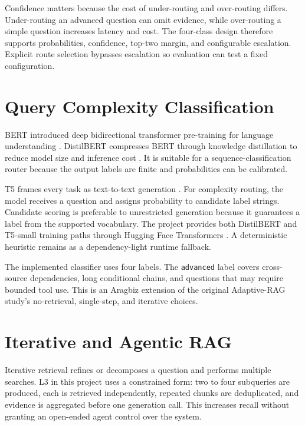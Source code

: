 Confidence matters because the cost of under-routing and over-routing differs.
Under-routing an advanced question can omit evidence, while over-routing a
simple question increases latency and cost. The four-class design therefore
supports probabilities, confidence, top-two margin, and configurable
escalation. Explicit route selection bypasses escalation so evaluation can test
a fixed configuration.

\section{Query Complexity Classification}

BERT introduced deep bidirectional transformer pre-training for language
understanding \cite{devlin2019bert}. DistilBERT compresses BERT through
knowledge distillation to reduce model size and inference cost
\cite{sanh2019distilbert,hinton2015distilling}. It is suitable for a
sequence-classification router because the output labels are finite and
probabilities can be calibrated.

T5 frames every task as text-to-text generation \cite{raffel2020t5}. For
complexity routing, the model receives a question and assigns probability to
candidate label strings. Candidate scoring is preferable to unrestricted
generation because it guarantees a label from the supported vocabulary. The
project provides both DistilBERT and T5-small training paths through Hugging
Face Transformers \cite{wolf2020transformers}. A deterministic heuristic
remains as a dependency-light runtime fallback.

The implemented classifier uses four labels. The \texttt{advanced} label covers
cross-source dependencies, long conditional chains, and questions that may
require bounded tool use. This is an Aragbiz extension of the original
Adaptive-RAG study's no-retrieval, single-step, and iterative choices.

\section{Iterative and Agentic RAG}

Iterative retrieval refines or decomposes a question and performs multiple
searches. L3 in this project uses a constrained form: two to four subqueries are
produced, each is retrieved independently, repeated chunks are deduplicated,
and evidence is aggregated before one generation call. This increases recall
without granting an open-ended agent control over the system.

